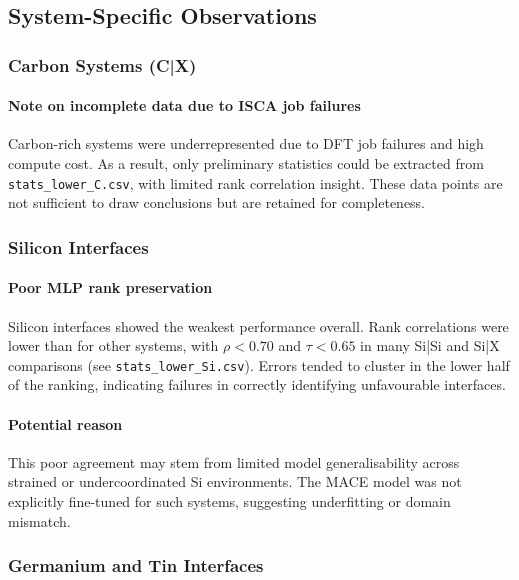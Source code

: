 \subsection{System-Specific Observations}

\subsubsection{Carbon Systems (C|X)}

\paragraph{Note on incomplete data due to ISCA job failures}

Carbon-rich systems were underrepresented due to DFT job failures and high compute cost. As a result, only preliminary
statistics could be extracted from \texttt{stats\_lower\_C.csv}, with limited rank correlation insight. These data
points are not sufficient to draw conclusions but are retained for completeness.

\subsubsection{Silicon Interfaces}

\paragraph{Poor MLP rank preservation}

Silicon interfaces showed the weakest performance overall. Rank correlations were lower than for other systems, with
$\rho < 0.70$ and $\tau < 0.65$ in many Si|Si and Si|X comparisons (see \texttt{stats\_lower\_Si.csv}). Errors tended to
cluster in the lower half of the ranking, indicating failures in correctly identifying unfavourable interfaces.

\paragraph{Potential reason}

This poor agreement may stem from limited model generalisability across strained or undercoordinated Si environments.
The MACE model was not explicitly fine-tuned for such systems, suggesting underfitting or domain mismatch.

\subsubsection{Germanium and Tin Interfaces}

